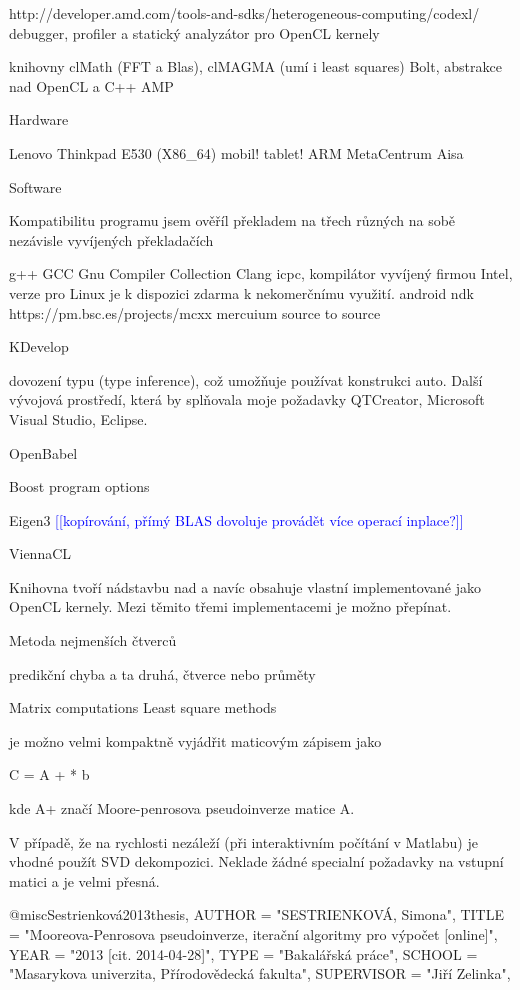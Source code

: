 \documentclass[10pt,draft,oneside]{fithesis2}
\newcommand\todo[1]{\textcolor{blue}{[[#1]]}}
\begin{document}
http://developer.amd.com/tools-and-sdks/heterogeneous-computing/codexl/
debugger, profiler a statický analyzátor pro OpenCL kernely

knihovny clMath (FFT a Blas), clMAGMA (umí i least squares)
Bolt, abstrakce nad OpenCL a C++ AMP

Hardware

Lenovo Thinkpad E530 (X86\_64)
mobil! tablet! ARM
MetaCentrum
Aisa

Software

Kompatibilitu programu jsem ověříl překladem na třech různých na sobě nezávisle vyvíjených překladačích

g++ GCC Gnu Compiler Collection
Clang
icpc, kompilátor vyvíjený firmou Intel, verze pro Linux je k dispozici zdarma k nekomerčnímu využití.
android ndk
https://pm.bsc.es/projects/mcxx mercuium source to source

KDevelop

dovození typu (type inference), což umožňuje používat konstrukci auto. Další vývojová prostředí, která by splňovala moje požadavky QTCreator, Microsoft Visual Studio, Eclipse.

OpenBabel

Boost program options

Eigen3
\todo{kopírování, přímý BLAS dovoluje provádět více operací inplace?}

ViennaCL

Knihovna tvoří nádstavbu nad  a navíc obsahuje vlastní implementované jako OpenCL kernely. Mezi těmito třemi implementacemi je možno přepínat.

Metoda nejmenších čtverců

predikční chyba a ta druhá, čtverce nebo průměty

Matrix computations Least square methods

je možno velmi kompaktně vyjádřit maticovým zápisem jako 

C = A + * b

kde A+ značí Moore-penrosova pseudoinverze matice A.

V případě, že na rychlosti nezáleží (při interaktivním počítání v Matlabu) je vhodné použít SVD dekompozici. Neklade žádné specialní požadavky na vstupní matici a je velmi přesná.

@misc{Sestrienková2013thesis,
AUTHOR = "SESTRIENKOVÁ, Simona",
TITLE = "Mooreova-Penrosova pseudoinverze, iterační algoritmy pro výpočet [online]",
YEAR = "2013 [cit. 2014-04-28]",
TYPE = "Bakalářská práce", 
SCHOOL = "Masarykova univerzita, Přírodovědecká fakulta",
SUPERVISOR = "Jiří Zelinka", 
}
\end{document}
